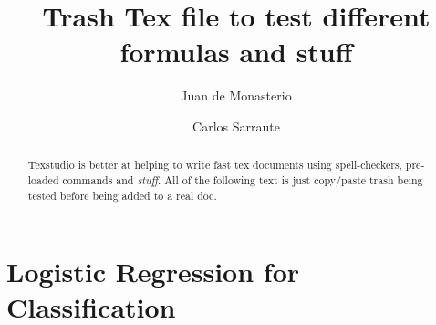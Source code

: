 \documentclass{article}%
\newcommand{\Expect}{{\mathbb{E}}}
\newtheorem{definition}{Definition}[subsection]
\theoremstyle{definition}
\begin{document}

\title{Trash Tex file to test different formulas and stuff}




\author{
	Juan de Monasterio
	\and Carlos Sarraute
}

%
%


\maketitle
\begin{abstract}
	
	Texstudio is better at helping to write fast tex documents using spell-checkers, pre-loaded commands and \textit{stuff}. All of the following text is just copy/paste trash being tested before being added to a real doc.
	



	
	
\end{abstract} 

\section{Logistic Regression for Classification}
\end{document}

